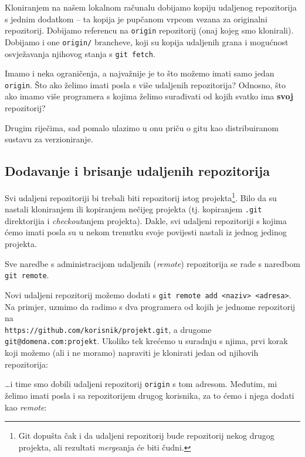 Kloniranjem na našem lokalnom računalu dobijamo kopiju udaljenog repozitorija s jednim dodatkom -- ta kopija je pupčanom vrpcom vezana za originalni repozitorij.
Dobijamo referencu na \verb+origin+ repozitorij (onaj kojeg smo klonirali).
Dobijamo i one \verb+origin/+ brancheve, koji su kopija udaljenih grana i mogućnost osvježavanja njihovog stanja s \verb+git fetch+.

Imamo i neka ograničenja, a najvažnije je to što možemo imati samo jedan \verb+origin+.
Što ako želimo imati posla s više udaljenih repozitorija?
Odnosno, što ako imamo više programera s kojima želimo surađivati od kojih svatko ima \textbf{svoj} repozitorij?

Drugim riječima, sad pomalo ulazimo u onu priču o gitu kao distribuiranom sustavu za verzioniranje.

\subsection*{Dodavanje i brisanje udaljenih repozitorija}

Svi udaljeni repozitoriji bi trebali biti repozitorij istog projekta\footnote{Git dopušta čak i da udaljeni repozitorij bude repozitorij nekog drugog projekta, ali rezultati \emph{merge}anja će biti čudni.}. 
Bilo da su nastali kloniranjem ili kopiranjem nečijeg projekta (tj. kopiranjem \verb+.git+ direktorijia i \emph{checkout}anjem projekta).
Dakle, svi udaljeni repozitoriji s kojima ćemo imati posla su u nekom trenutku svoje povijesti nastali iz jednog jedinog projekta.

Sve naredbe s administracijom udaljenih (\emph{remote}) repozitorija se rade s naredbom \\ \verb+git remote+.

Novi udaljeni repozitorij možemo dodati s \verb+git remote add <naziv> <adresa>+.
Na primjer, uzmimo da radimo s dva programera od kojih je jednome repozitorij na \\\verb+https://github.com/korisnik/projekt.git+, a drugome \verb+git@domena.com:projekt+.
Ukoliko tek krećemo u suradnju s njima, prvi korak koji možemo (ali i ne moramo) napraviti je klonirati jedan od njihovih repozitorija:


\dots{}i time smo dobili udaljeni repozitorij \verb+origin+ s tom adresom.
Međutim, mi želimo imati posla i sa repozitorijem drugog korisnika, za to ćemo i njega dodati kao \emph{remote}:


